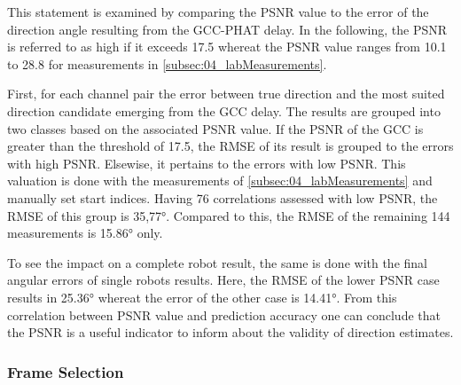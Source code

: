 This statement is examined by comparing the \ac{PSNR} value
to the error of the direction angle resulting from the \ac{GCC-PHAT} delay.
In the following, the \ac{PSNR} is referred to as high if it exceeds 17.5
whereat the \ac{PSNR} value ranges from 10.1 to 28.8 for measurements in
\cref{subsec:04_labMeasurements}.

First, for each channel pair the error between true direction and the most
suited direction candidate
emerging from the \ac{GCC} delay.
The results are grouped into two classes based on the associated \ac{PSNR} value.
If the \ac{PSNR} of the \ac{GCC} is greater than the threshold of 17.5,
the \ac{RMSE} of its result is grouped to the errors with high \ac{PSNR}.
Elsewise, it pertains to the errors with low \ac{PSNR}.
This valuation is done with the measurements of \cref{subsec:04_labMeasurements}
and manually set start indices.
Having 76 correlations assessed with low \ac{PSNR}, the \ac{RMSE} of this group
is 35,77\si{\degree}.
Compared to this, the \ac{RMSE} of the remaining 144 measurements
is 15.86\si{\degree} only.

To see the impact on a complete robot result, the same is done
with the final angular errors of single robots results.
Here, the \ac{RMSE} of the lower \ac{PSNR} case results in 25.36\si{\degree}
whereat the error of the other case is 14.41\si{\degree}.
From this correlation between PSNR value and prediction accuracy one can
conclude that the PSNR is a useful indicator to inform about the validity of
direction estimates.

\subsubsection*{Frame Selection}

